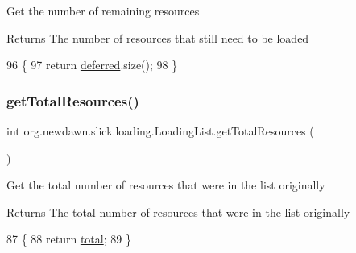 Get the number of remaining resources

\begin{DoxyReturn}{Returns}
The number of resources that still need to be loaded 
\end{DoxyReturn}

\begin{DoxyCode}
96                                        \{
97         \textcolor{keywordflow}{return} \mbox{\hyperlink{classorg_1_1newdawn_1_1slick_1_1loading_1_1_loading_list_a5ec264187931448fbcf900ccf59bab72}{deferred}}.size();
98     \}
\end{DoxyCode}
\mbox{\label{classorg_1_1newdawn_1_1slick_1_1loading_1_1_loading_list_ae3458b4d334c4e5e8066bee1412e5991}} 
\subsubsection{\texorpdfstring{get\+Total\+Resources()}{getTotalResources()}}
{\footnotesize\ttfamily int org.\+newdawn.\+slick.\+loading.\+Loading\+List.\+get\+Total\+Resources (\begin{DoxyParamCaption}{ }\end{DoxyParamCaption})\hspace{0.3cm}{\ttfamily [inline]}}

Get the total number of resources that were in the list originally

\begin{DoxyReturn}{Returns}
The total number of resources that were in the list originally 
\end{DoxyReturn}

\begin{DoxyCode}
87                                    \{
88         \textcolor{keywordflow}{return} \mbox{\hyperlink{classorg_1_1newdawn_1_1slick_1_1loading_1_1_loading_list_a26a2808de2c1171ed883cc89831b0332}{total}};
89     \}
\end{DoxyCode}
\mbox{\label{classorg_1_1newdawn_1_1slick_1_1loading_1_1_loading_list_afad049e7891ae5e6d7fc194664ca58b4}} 
